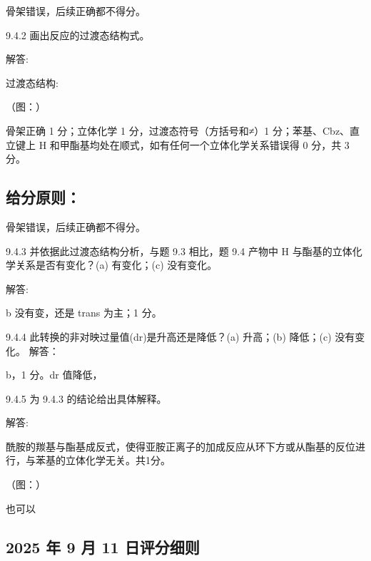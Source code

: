 骨架错误，后续正确都不得分。

9.4.2 画出反应的过渡态结构式。

解答:

过渡态结构:

（图：）

骨架正确 1 分；立体化学 1 分，过渡态符号（方括号和≠）1 分；苯基、Cbz、直立键上 H 和甲酯基均处在顺式，如有任何一个立体化学关系错误得 0 分，共 3 分。

\subsection*{给分原则：}

骨架错误，后续正确都不得分。

9.4.3 并依据此过渡态结构分析，与题 9.3 相比，题 9.4 产物中 H 与酯基的立体化学关系是否有变化？(a) 有变化；(c) 没有变化。

解答:

b 没有变，还是 trans 为主；1 分。

9.4.4 此转换的非对映过量值(dr)是升高还是降低？(a) 升高；(b) 降低；(c) 没有变化。
解答：

b，1 分。dr 值降低，

9.4.5 为 9.4.3 的结论给出具体解释。

解答:

酰胺的羰基与酯基成反式，使得亚胺正离子的加成反应从环下方或从酯基的反位进行，与苯基的立体化学无关。共1分。

（图：）

也可以

\subsection*{2025 年 9 月 11 日评分细则}
